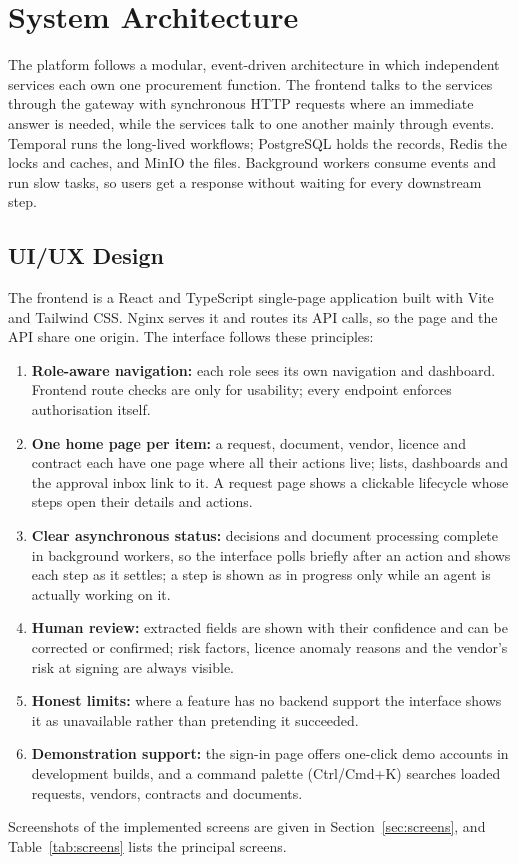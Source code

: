 \section{System Architecture}
The platform follows a modular, event-driven architecture in which independent services each own one procurement function. The frontend talks to the services through the gateway with synchronous HTTP requests where an immediate answer is needed, while the services talk to one another mainly through events. Temporal runs the long-lived workflows; PostgreSQL holds the records, Redis the locks and caches, and MinIO the files. Background workers consume events and run slow tasks, so users get a response without waiting for every downstream step.

\subsection{UI/UX Design}
The frontend is a React and TypeScript single-page application built with Vite and Tailwind CSS. Nginx serves it and routes its API calls, so the page and the API share one origin. The interface follows these principles:
\begin{enumerate}
  \item \textbf{Role-aware navigation:} each role sees its own navigation and dashboard. Frontend route checks are only for usability; every endpoint enforces authorisation itself.
  \item \textbf{One home page per item:} a request, document, vendor, licence and contract each have one page where all their actions live; lists, dashboards and the approval inbox link to it. A request page shows a clickable lifecycle whose steps open their details and actions.
  \item \textbf{Clear asynchronous status:} decisions and document processing complete in background workers, so the interface polls briefly after an action and shows each step as it settles; a step is shown as in progress only while an agent is actually working on it.
  \item \textbf{Human review:} extracted fields are shown with their confidence and can be corrected or confirmed; risk factors, licence anomaly reasons and the vendor's risk at signing are always visible.
  \item \textbf{Honest limits:} where a feature has no backend support the interface shows it as unavailable rather than pretending it succeeded.
  \item \textbf{Demonstration support:} the sign-in page offers one-click demo accounts in development builds, and a command palette (Ctrl/Cmd+K) searches loaded requests, vendors, contracts and documents.
\end{enumerate}
Screenshots of the implemented screens are given in Section~\ref{sec:screens}, and Table~\ref{tab:screens} lists the principal screens.

